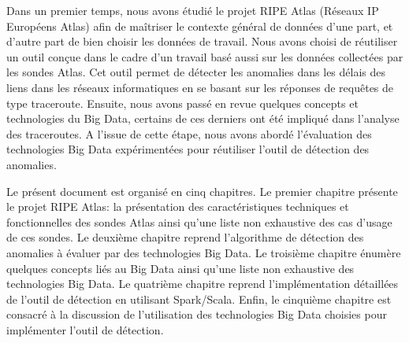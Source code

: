 
Dans un premier temps, nous avons étudié le projet RIPE  Atlas (Réseaux IP Européens Atlas) afin de maîtriser le contexte général de données  d'une part, et d'autre part de bien choisir les données de travail. Nous avons choisi de réutiliser un outil conçue dans le cadre d'un travail basé aussi sur les données collectées par les sondes Atlas. Cet outil permet de détecter les anomalies dans les délais des liens dans les réseaux informatiques en se basant sur les réponses de requêtes de type traceroute. 
 Ensuite, nous avons passé en revue quelques concepts  et   technologies du Big Data, certains de ces derniers ont été impliqué dans l'analyse des traceroutes. A l'issue de cette étape, nous avons abordé l'évaluation des technologies Big Data expérimentées  pour réutiliser l'outil de  détection des anomalies.



Le présent document est organisé en cinq chapitres. Le premier chapitre présente le projet RIPE Atlas: la présentation des caractéristiques techniques et fonctionnelles des sondes Atlas ainsi qu'une liste non exhaustive des cas d'usage de ces sondes. Le deuxième chapitre reprend l'algorithme de  détection des anomalies  à évaluer par des technologies Big Data.
Le troisième chapitre énumère quelques concepts liés au Big Data ainsi qu'une liste non exhaustive des technologies Big Data.
Le quatrième chapitre reprend l'implémentation détaillées de l'outil de détection en utilisant  Spark/Scala. Enfin, le cinquième  chapitre est consacré à la discussion de l'utilisation des technologies Big Data choisies pour implémenter l'outil de détection.



